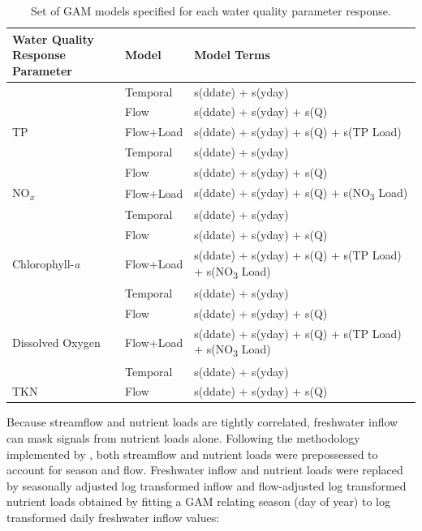 \documentclass[water,article,submit,oneauthor]{Definitions/mdpi}
\begin{document}
\begin{table}[H]

\caption{\label{tab:estgammodels}Set of GAM models specified for each water quality parameter response.}
\centering
\begin{tabular}[t]{lll}
\toprule
\makecell[l]{Water Quality\\Response Parameter} & Model & Model Terms\\
\midrule
 & Temporal & s(ddate) + s(yday)\\

 & Flow & s(ddate) + s(yday) + s(Q)\\

\multirow{-3}{*}{\raggedright\arraybackslash TP} & Flow+Load & s(ddate) + s(yday) + s(Q) + s(TP Load)\\
\cmidrule{1-3}
 & Temporal & s(ddate) + s(yday)\\

 & Flow & s(ddate) + s(yday) + s(Q)\\

\multirow{-3}{*}{\raggedright\arraybackslash NO\textsubscript{\emph{x}}} & Flow+Load & s(ddate) + s(yday) + s(Q) + s(NO\textsubscript{3} Load)\\
\cmidrule{1-3}
 & Temporal & s(ddate) + s(yday)\\

 & Flow & s(ddate) + s(yday) + s(Q)\\

\multirow{-3}{*}{\raggedright\arraybackslash Chlorophyll-\emph{a}} & Flow+Load & s(ddate) + s(yday) + s(Q) + s(TP Load) + s(NO\textsubscript{3} Load)\\
\cmidrule{1-3}
 & Temporal & s(ddate) + s(yday)\\

 & Flow & s(ddate) + s(yday) + s(Q)\\

\multirow{-3}{*}{\raggedright\arraybackslash Dissolved Oxygen} & Flow+Load & s(ddate) + s(yday) + s(Q) + s(TP Load) + s(NO\textsubscript{3}  Load)\\
\cmidrule{1-3}
 & Temporal & s(ddate) + s(yday)\\

\multirow{-2}{*}{\raggedright\arraybackslash TKN} & Flow & s(ddate) + s(yday) + s(Q)\\
\bottomrule
\end{tabular}
\end{table}

Because streamflow and nutrient loads are tightly correlated, freshwater
inflow can mask signals from nutrient loads alone. Following the
methodology implemented by
\citet{murphyNutrientImprovementsChesapeake2022}, both streamflow and
nutrient loads were prepossessed to account for season and flow.
Freshwater inflow and nutrient loads were replaced by seasonally
adjusted log transformed inflow and flow-adjusted log transformed
nutrient loads obtained by fitting a GAM relating season (day of year)
to log transformed daily freshwater inflow values:
\end{document}
